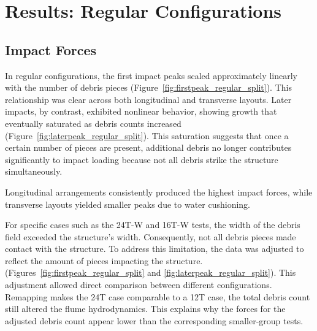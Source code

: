 \documentclass{article}
\begin{document}
\section{Results: Regular Configurations}

\subsection{Impact Forces} In regular configurations, the first impact peaks scaled approximately linearly with the number of debris pieces (Figure~\ref{fig:firstpeak_regular_split}). This relationship was clear across both longitudinal and transverse layouts. Later impacts, by contrast, exhibited nonlinear behavior, showing growth that eventually saturated as debris counts increased (Figure~\ref{fig:laterpeak_regular_split}). This saturation suggests that once a certain number of pieces are present, additional debris no longer contributes significantly to impact loading because not all debris strike the structure simultaneously.

Longitudinal arrangements consistently produced the highest impact forces, while transverse layouts yielded smaller peaks due to water cushioning.

For specific cases such as the 24T-W and 16T-W tests, the width of the debris field exceeded the structure’s width. Consequently, not all debris pieces made contact with the structure. To address this limitation, the data was adjusted to reflect the amount of pieces impacting the structure.  (Figures~\ref{fig:firstpeak_regular_split} and \ref{fig:laterpeak_regular_split}). This adjustment allowed direct comparison between different configurations. Remapping makes the 24T case comparable to a 12T case, the total debris count still altered the flume hydrodynamics. This explains why the forces for the adjusted debris count appear lower than the corresponding
smaller-group tests. 
\end{document}
